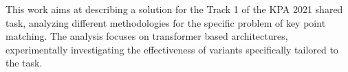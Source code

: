This work aims at describing a solution for the Track 1 of the KPA 2021 shared task, analyzing different methodologies for the specific problem of key point matching. The analysis focuses on transformer based architectures, experimentally investigating the effectiveness of variants specifically tailored to the task.
